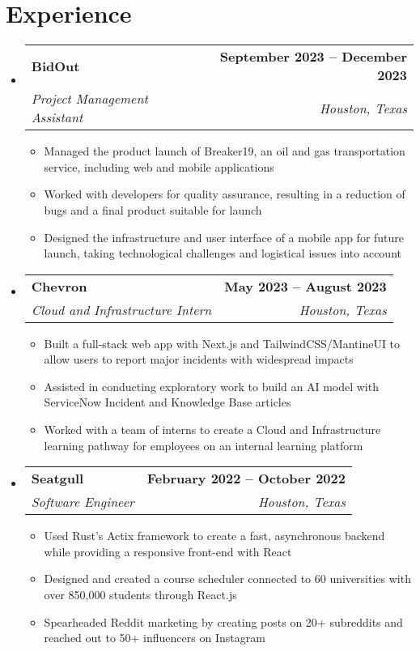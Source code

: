 \documentclass[letterpaper,11pt]{article}
\makeatletter
\newcommand{\resumeItem}[1]{
  \item\small{
    {#1 \vspace{-2pt}}
  }
}
\newcommand{\resumeSubheading}[4]{
  \vspace{-2pt}\item
    \begin{tabular*}{1.0\textwidth}[t]{l@{\extracolsep{\fill}}r}
      \textbf{#1} & \textbf{\small #2} \\
      \textit{\small#3} & \textit{\small #4} \\
    \end{tabular*}\vspace{-7pt}
}
\newcommand{\resumeSubHeadingListStart}{\begin{itemize}[leftmargin=0.0in, label={}]}
\newcommand{\resumeSubHeadingListEnd}{\end{itemize}}
\newcommand{\resumeItemListStart}{\begin{itemize}}
\newcommand{\resumeItemListEnd}{\end{itemize}\vspace{-5pt}}
\makeatother
\begin{document}
\section{Experience}
  \resumeSubHeadingListStart
\begin{comment}  
    \resumeSubheading
      {Chevron}{November 2022 -- Present}
      {Incoming Software Engineer Intern}{Houston, Texas}
\end{comment}      
    \resumeSubheading
      {BidOut}{September 2023 -- December 2023}
      {Project Management Assistant}{Houston, Texas}
        \resumeItemListStart
        \resumeItem{Managed the product launch of Breaker19, an oil and gas transportation service, including web and mobile applications}
        \resumeItem{Worked with developers for quality assurance, resulting in a reduction of bugs and a final product suitable for launch}
        \resumeItem{Designed the infrastructure and user interface of a mobile app for future launch, taking technological challenges and logistical issues into account}
      \resumeItemListEnd
      
    \resumeSubheading
      {Chevron}{May 2023 -- August 2023}
      {Cloud and Infrastructure Intern}{Houston, Texas}
        \resumeItemListStart
        \resumeItem{Built a full-stack web app with Next.js and TailwindCSS/MantineUI to allow users to report major incidents with widespread impacts}
        \resumeItem{Assisted in conducting exploratory work to build an AI model with ServiceNow Incident and Knowledge Base articles}
        \resumeItem{Worked with a team of interns to create a Cloud and Infrastructure learning pathway for employees on an internal learning platform}
      \resumeItemListEnd
      
    \resumeSubheading
      {Seatgull}{February 2022 -- October 2022}
      {Software Engineer}{Houston, Texas}
      \resumeItemListStart
        \resumeItem{Used Rust’s Actix framework to create a fast, asynchronous backend while providing a responsive front-end with React}
        \resumeItem{Designed and created a course scheduler connected to 60 universities with over 850,000 students through React.js}
        \resumeItem{Spearheaded Reddit marketing by creating posts on 20+ subreddits and reached out to 50+ influencers on Instagram}
      \resumeItemListEnd
  \resumeSubHeadingListEnd
\vspace{-16pt}


\end{document}

